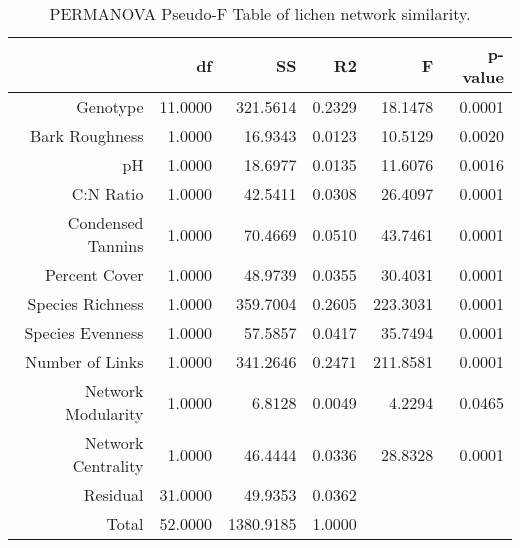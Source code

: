 \begin{table}[ht]
\centering
\begin{tabular}{rrrrrr}
  \hline
 & df & SS & R2 & F & p-value \\ 
  \hline
Genotype & 11.0000 & 321.5614 & 0.2329 & 18.1478 & 0.0001 \\ 
  Bark Roughness & 1.0000 & 16.9343 & 0.0123 & 10.5129 & 0.0020 \\ 
  pH & 1.0000 & 18.6977 & 0.0135 & 11.6076 & 0.0016 \\ 
  C:N Ratio & 1.0000 & 42.5411 & 0.0308 & 26.4097 & 0.0001 \\ 
  Condensed Tannins & 1.0000 & 70.4669 & 0.0510 & 43.7461 & 0.0001 \\ 
  Percent Cover & 1.0000 & 48.9739 & 0.0355 & 30.4031 & 0.0001 \\ 
  Species Richness & 1.0000 & 359.7004 & 0.2605 & 223.3031 & 0.0001 \\ 
  Species Evenness & 1.0000 & 57.5857 & 0.0417 & 35.7494 & 0.0001 \\ 
  Number of Links & 1.0000 & 341.2646 & 0.2471 & 211.8581 & 0.0001 \\ 
  Network Modularity & 1.0000 & 6.8128 & 0.0049 & 4.2294 & 0.0465 \\ 
  Network Centrality & 1.0000 & 46.4444 & 0.0336 & 28.8328 & 0.0001 \\ 
  Residual & 31.0000 & 49.9353 & 0.0362 &  &  \\ 
  Total & 52.0000 & 1380.9185 & 1.0000 &  &  \\ 
   \hline
\end{tabular}
\caption{PERMANOVA Pseudo-F Table of lichen network similarity.} 
\label{tab:cn_perm}
\end{table}
